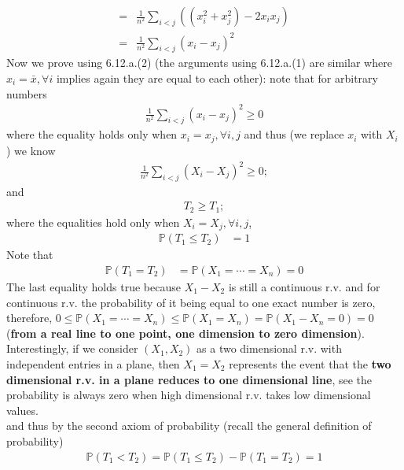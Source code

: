 \begin{exercise} [BH.6.12]
\begin{solution}
\begin{enumerate}
{\begin{align*}
			= & \frac{1}{n^2}\sum_{i<j}\left(  \left(x_i^2 + x_j^2\right) -       2 x_i x_j  \right)  \\
			= & \frac{1}{n^2}\sum_{i<j}\left(   x_i -x_j  \right)^2 
		\end{align*}
	}
	Now we prove using 6.12.a.(2) (the arguments using 6.12.a.(1) are similar where $x_i=\bar{x}, \forall i$ implies again they are equal to each other): note that for arbitrary numbers	 
	\begin{align*}
		\frac{1}{n^2} \sum_{i < j} (x_i-x_j)^2 \geq 0   
	\end{align*}
	where the equality holds only when $x_i=x_j, \forall i,j$
	and thus { (we replace $x_i$ with $X_i$) we know 
		\begin{align*}
			\frac{1}{n^2} \sum_{i < j} (X_i-X_j)^2 \geq 0;   
		\end{align*}
		and \begin{align*}
			T_2\geq T_1; 
		\end{align*}
		where the equalities hold only when $X_i=X_j, \forall i,j$,                      
		\begin{align*}
			\mathbb{P}\left(T_1\leq T_2 \right) &= 1 
	\end{align*}}
	Note that 
	\begin{align*}
		\mathbb{P}\left(T_1 = T_2 \right) &= \mathbb{P}\left(X_1=\cdots =X_n \right) =0 	
	\end{align*}
	{  The last equality holds true because $X_1-X_2$ is still a continuous r.v. and for continuous r.v. the probability of it being equal to one exact number is zero, therefore,  $0\leq \mathbb{P}\left(X_1=\cdots =X_n \right) \leq \mathbb{P}\left(X_1 =X_n \right)= \mathbb{P}\left(X_1 -X_n =0\right)=0$ (\textbf{from a real line to one point, one dimension to zero dimension}). Interestingly, if we consider $(X_1, X_2)$ as a two dimensional r.v. with independent entries in a plane, then $X_1=X_2$ represents the event that the \textbf{two dimensional r.v. in a plane reduces to one dimensional line}, see the probability is always zero when high dimensional r.v. takes low dimensional values. }
	\\	and thus by the second axiom of probability (recall the general definition of probability)
	\begin{align*}
		\mathbb{P}\left(T_1< T_2 \right)=\mathbb{P}\left(T_1\leq T_2 \right)-\mathbb{P}\left(T_1= T_2 \right)= 1 
	\end{align*}~\\~\\

\end{enumerate}
\end{solution}
\end{exercise}
